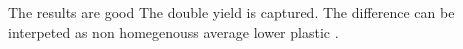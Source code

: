 The results are good
The double yield is captured.
The difference can be interpeted as non homegenouss average lower plastic .


%
%
%
%
%
%
%
%
%
%
%
